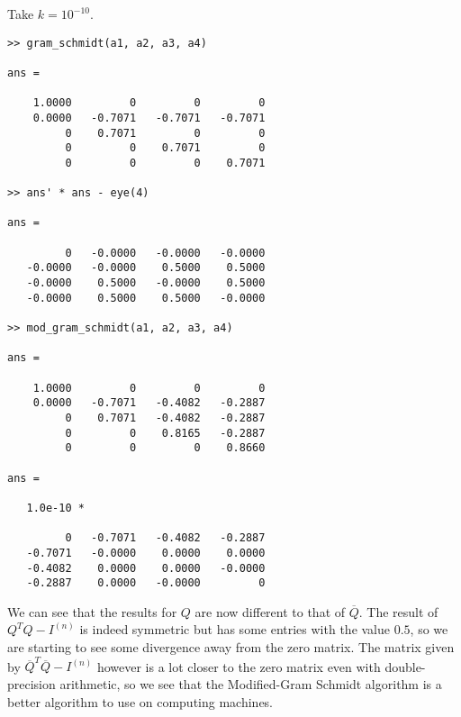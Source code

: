 \documentclass{article}
\begin{document}
\begin{enumerate}
\begin{enumerate}
    \newpage
    Take $k = 10^{-10}$.
    \begin{verbatim}
>> gram_schmidt(a1, a2, a3, a4)

ans =

    1.0000         0         0         0
    0.0000   -0.7071   -0.7071   -0.7071
         0    0.7071         0         0
         0         0    0.7071         0
         0         0         0    0.7071
         
>> ans' * ans - eye(4)

ans =

         0   -0.0000   -0.0000   -0.0000
   -0.0000   -0.0000    0.5000    0.5000
   -0.0000    0.5000   -0.0000    0.5000
   -0.0000    0.5000    0.5000   -0.0000
   
>> mod_gram_schmidt(a1, a2, a3, a4)

ans =

    1.0000         0         0         0
    0.0000   -0.7071   -0.4082   -0.2887
         0    0.7071   -0.4082   -0.2887
         0         0    0.8165   -0.2887
         0         0         0    0.8660
      
ans =

   1.0e-10 *

         0   -0.7071   -0.4082   -0.2887
   -0.7071   -0.0000    0.0000    0.0000
   -0.4082    0.0000    0.0000   -0.0000
   -0.2887    0.0000   -0.0000         0
    \end{verbatim}
    We can see that the results for $Q$ are now different to that of $\overline{Q}$. The result of $Q^TQ - I^{(n)}$ is indeed symmetric but has some entries with the value $0.5$, so we are starting to see some divergence away from the zero matrix. The matrix given by $\overline{Q}^T\overline{Q} - I^{(n)}$ however is a lot closer to the zero matrix even with double-precision arithmetic, so we see that the Modified-Gram Schmidt algorithm is a better algorithm to use on computing machines.
    
  \end{enumerate}
\end{enumerate}
\end{document}
